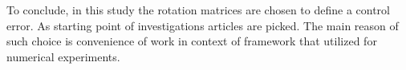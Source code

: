 To conclude, in this study the rotation matrices are chosen to define a 
control error. As starting point of investigations articles 
\cite{OutFeedbackStabForOrbRob,ANonlinearObserverUsingPose} are picked. 
The main reason of such choice is convenience of work in context of 
framework \cite{Pinocchio} that utilized for numerical experiments.

